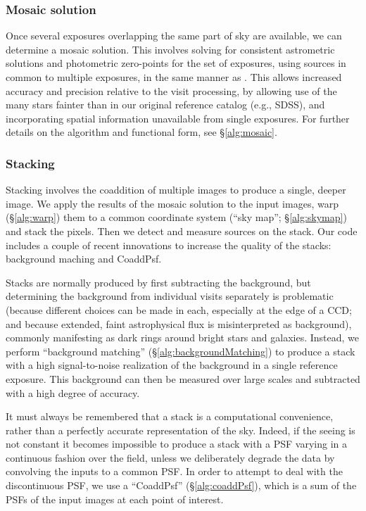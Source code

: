 \documentclass[12pt]{article}
\begin{document}
\subsubsection{Mosaic solution}

Once several exposures overlapping the same part of sky are available, we can determine a mosaic solution.
This involves solving for consistent astrometric solutions and photometric zero-points for the set of
exposures, using sources in common to multiple exposures, in the same manner as \citet{2008ApJ...674.1217P}.
This allows increased accuracy and precision relative to the visit processing, by allowing use of the many stars
fainter than in our original reference catalog (e.g., SDSS), and incorporating spatial information unavailable
from single exposures.  For further details on the algorithm and functional form, see \S\ref{alg:mosaic}.


\subsubsection{Stacking}
\label{flow:stack}

Stacking involves the coaddition of multiple images to produce a single, deeper image.  We apply the results
of the mosaic solution to the input images, warp (\S\ref{alg:warp}) them to a common coordinate system
(``sky map'';
\S\ref{alg:skymap}) and stack the pixels.  Then we detect and measure sources on the stack.  Our code
includes a couple of recent innovations to increase the quality of the stacks: background maching and
CoaddPsf.

Stacks are normally produced by first subtracting the background, but determining the background from
individual visits separately is problematic (because different choices can be made in each, especially at
the edge of a CCD; and because extended, faint astrophysical flux is misinterpreted as background), commonly
manifesting
as dark rings around bright stars and galaxies.  Instead, we perform ``background matching''
(\S\ref{alg:backgroundMatching}) to produce a stack with a high signal-to-noise realization of the background
in a single reference exposure.  This background can then be measured over large scales and subtracted with a
high degree of accuracy.

It must always be remembered that a stack is a computational convenience, rather than a perfectly accurate
representation of the sky.  Indeed, if the seeing is not constant it becomes impossible to produce a
stack with a PSF varying in a continuous fashion over the field, unless we deliberately degrade the data by
convolving the inputs to a common PSF.  In order to attempt to deal with the discontinuous PSF, we use a
``CoaddPsf'' (\S\ref{alg:coaddPsf}), which is a sum of the PSFs of the input images at each point of interest.
\end{document}
